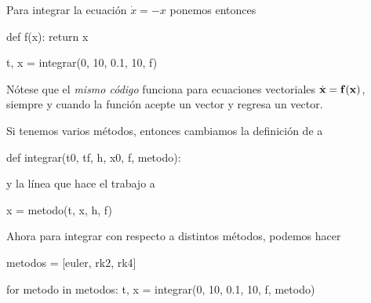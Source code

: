 Para integrar la ecuación $\dot{x} = -x$ ponemos entonces
\begin{python}
def f(x):
  return x

t, x = integrar(0, 10, 0.1, 10, f)
\end{python}

Nótese que el \emph{mismo código} funciona para ecuaciones vectoriales $\dot{\mathbf{x}} = \mathbf{f}(\mathbf{x})$, siempre y cuando la función  acepte un vector y regresa un vector.

Si tenemos varios métodos, entonces cambiamos la definición de  a
\begin{python}
def integrar(t0, tf, h, x0, f, metodo):
\end{python}
y la línea que hace el trabajo a
\begin{python}
x = metodo(t, x, h, f)
\end{python}

Ahora para integrar con respecto a distintos métodos, podemos hacer
\begin{python}
metodos = [euler, rk2, rk4]

for metodo in metodos:
  t, x = integrar(0, 10, 0.1, 10, f, metodo)
\end{python}






